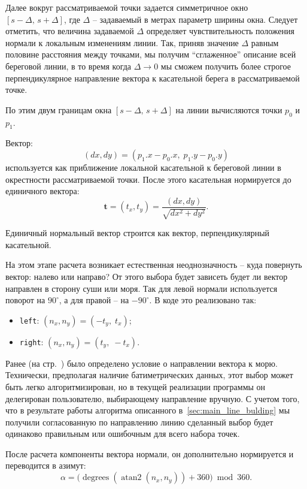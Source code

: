 Далее вокруг рассматриваемой точки задается симметричное окно $[s-\Delta,\, s+\Delta]$, где $\Delta$ -- задаваемый в метрах параметр ширины окна.
Следует отметить, что величина задаваемой $\Delta$ определяет чувствительность положения нормали к локальным изменениям линии.
Так, приняв значение $\Delta$ равным половине расстояния между точками, мы получим \enquote{сглаженное} описание всей береговой линии, в то время когда $\Delta → 0$ мы сможем получить более строгое перпендикулярное направление вектора к касательной берега в рассматриваемой точке.

По этим двум границам окна $[s-\Delta,\, s+\Delta]$ на линии вычисляются точки $p_0$ и $p_1$.

Вектор:
\begin{equation}
    (dx,dy) = (p_1.x-p_0.x,\; p_1.y-p_0.y)
\end{equation}
используется как приближение локальной касательной к береговой линии в окрестности рассматриваемой точки.
После этого касательная нормируется до единичного вектора:
\begin{equation}
    \mathbf{t} = (t_x,t_y) = \frac{(dx,dy)}{\sqrt{dx^2+dy^2}}.
\end{equation}

Единичный нормальный вектор строится как вектор, перпендикулярный касательной.

На этом этапе расчета возникает естественная неоднозначность -- куда повернуть вектор: налево или направо?
От этого выбора будет зависеть будет ли вектор направлен в сторону суши или моря.
Так для левой нормали используется поворот на $90^\circ$, а для правой -- на $-90^\circ$. В коде это реализовано так:
\begin{itemize}
    \item \texttt{left}: $(n_x,n_y)=(-t_y,\; t_x)$;
    \item \texttt{right}: $(n_x,n_y)=(t_y,\; -t_x)$.
\end{itemize}


Ранее (на стр.~\pageref{eq:norm_vect_line}) было определено условие о направлении вектора к морю.
Технически, предполагая наличие батиметрических данных, этот выбор может быть легко алгоритмизирован, но в текущей реализации программы он делегирован пользователю, выбирающему направление вручную. 
С учетом того, что в результате работы алгоритма описанного в~\ref{sec:main_line_bulding} мы получили согласованную по направлению линию сделанный выбор будет одинаково правильным или ошибочным для всего набора точек.

После расчета компоненты вектора нормали, он дополнительно нормируется и переводится в азимут:
\begin{equation}\label{eq:azimuth_calc}
    \alpha = \bigl(\operatorname{degrees}(\operatorname{atan2}(n_x,n_y)) + 360\bigr)\bmod 360.
\end{equation}

